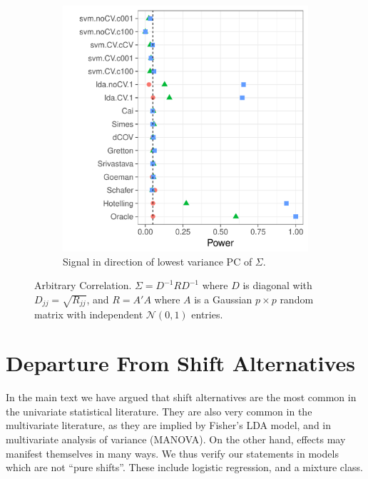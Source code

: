 \documentclass[]{bio}
\begin{document}
\begin{figure}[h]
\begin{subfigure}[t]{.45\columnwidth}
		\includegraphics[width=1\columnwidth]{"art/file17"}
		\caption{Signal in direction of lowest variance PC of $\Sigma$.} 
		\label{fig:dependence_32}
	\end{subfigure}
	\caption{Arbitrary Correlation. 
		$\Sigma=D^{-1} R D^{-1}$ where $D$ is diagonal with $D_{jj}=\sqrt{R_{jj}}$, and $R=A'A$ where $A$ is a Gaussian $p\times p$ random matrix with independent $\mathcal{N}(0,1)$ entries.
	}
	\label{fig:dependence_3}
\end{figure}






\section{Departure From Shift Alternatives}

In the main text we have argued that shift alternatives are the most common in the univariate statistical literature. 
They are also very common in the multivariate literature, as they are implied by Fisher's LDA model, and in multivariate analysis of variance (MANOVA).
On the other hand, effects may manifest themselves in many ways. 
We thus verify our statements in models which are not ``pure shifts''. 
These include logistic regression, and a mixture class. 
\end{document}
